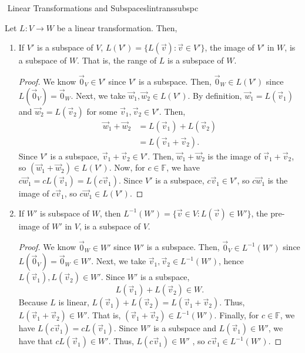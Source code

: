         \begin{theorem}{\Stop\,\,Linear Transformations and Subspaces}{lintranssubspc}

            Let \(L:V\to W\) be a linear transformation. Then,
            \begin{enumerate}
                \item If \(V'\) is a subspace of \(V\), \(L(V')=\{L(\vec{v}):\vec{v}\in V'\}\), the image of \(V'\) in \(W\), is a subspace of \(W\). That is, the range of \(L\) is a subspace of \(W\).
                \begin{proof}
                    We know \(\vec{0}_V\in V'\) since \(V'\) is a subspace. Then, \(\vec{0}_W\in L(V')\) since \(L(\vec{0}_V)=\vec{0}_W\). Next, we take \(\vec{w}_1,\vec{w}_2\in L(V')\). By definition, \(\vec{w}_1=L(\vec{v}_1)\) and \(\vec{w}_2=L(\vec{v}_2)\) for some \(\vec{v}_1,\vec{v}_2\in V'\). Then,
                    \begin{align*}
                        \vec{w}_1+\vec{w}_2&=L(\vec{v}_1)+L(\vec{v}_2) \\
                        &=L(\vec{v}_1+\vec{v}_2).
                    \end{align*}
                    Since \(V'\) is a subspace, \(\vec{v}_1+\vec{v}_2\in V'\). Then, \(\vec{w}_1+\vec{w}_2\) is the image of \(\vec{v}_1+\vec{v}_2\), so \((\vec{w}_1+\vec{w}_2)\in L(V')\). Now, for \(c\in\mathbb{F}\), we have \(c\vec{w}_1=cL(\vec{v}_1)=L(c\vec{v}_1)\). Since \(V'\) is a subspace, \(c\vec{v}_1\in V'\), so \(c\vec{w}_1\) is the image of \(c\vec{v}_1\), so \(c\vec{w}_1\in L(V')\).
                \end{proof}
                \item If \(W'\) is subspace of \(W\), then \(L^{-1}(W')=\{\vec{v}\in V:L(\vec{v})\in W'\}\), the pre-image of \(W'\) in \(V\), is a subspace of \(V\).
                \begin{proof}
                    We know \(\vec{0}_W\in W'\) since \(W'\) is a subspace. Then, \(\vec{0}_V\in L^{-1}(W')\) since \(L(\vec{0}_V)=\vec{0}_W\in W'\). Next, we take \(\vec{v}_1,\vec{v}_2\in L^{-1}(W')\), hence \(L(\vec{v}_1),L(\vec{v}_2)\in W'\). Since \(W'\) is a subspace,
                    \begin{equation*}
                        L(\vec{v}_1)+L(\vec{v}_2)\in W.
                    \end{equation*}
                    Because \(L\) is linear, \(L(\vec{v}_1)+L(\vec{v}_2)=L(\vec{v}_1+\vec{v}_2)\). Thus, \(L(\vec{v}_1+\vec{v}_2)\in W'\). That is, \((\vec{v}_1+\vec{v}_2)\in L^{-1}(W')\). Finally, for \(c\in\mathbb{F}\), we have \(L(c\vec{v}_1)=cL(\vec{v}_1)\). Since \(W'\) is a subspace and \(L(\vec{v}_1)\in W'\), we have that \(cL(\vec{v}_1)\in W'\). Thus, \(L(c\vec{v}_1)\in W'\) , so \(c\vec{v}_1\in L^{-1}(W')\).
                \end{proof}
            \end{enumerate}
            
        \end{theorem}
        \pagebreak
